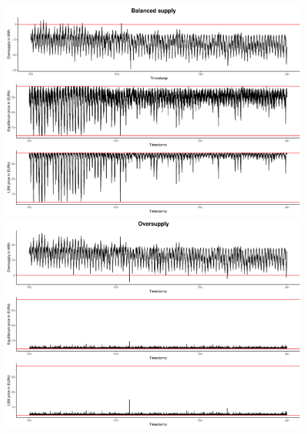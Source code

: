 \begin{figure}[H]
    \centering
    \includegraphics[width=\textwidth-.85cm]{thesis/graphs/marketsimulation/marketoutcome_pred.pdf}\\\vspace{.6cm}
    \includegraphics[width=\textwidth-.85cm]{thesis/graphs/marketsimulation/marketoutcome_pred_oversupply.pdf}
\end{figure}
    
